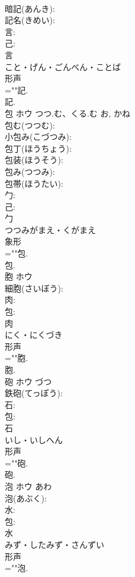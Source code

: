 \documentclass[8pt]{extreport}
\begin{document}
\begin{CJK}{UTF8}{min}
\\	暗記(あんき): 
\\	記名(きめい): 
\\	言: 
\\	己: 
\\	言	
\\	こと・げん・ごんべん・ことば	
\\	形声 
\\	=""記.
\\	記.
\\	包	ホウ	つつ.む、くる.む	お, かね	
\\	包む(つつむ): 
\\	小包み(こづつみ): 
\\	包丁(ほうちょう): 
\\	包装(ほうそう): 
\\	包み(つつみ): 
\\	包帯(ほうたい): 
\\	勹: 
\\	己: 
\\	勹	
\\	つつみがまえ・くがまえ	
\\	象形 
\\	=""包.
\\	包.
\\	胞	ホウ			
\\	細胞(さいぼう): 
\\	肉: 
\\	包: 
\\	肉	
\\	にく・にくづき	
\\	形声 
\\	=""胞.
\\	胞.
\\	砲	ホウ		づつ	
\\	鉄砲(てっぽう): 
\\	石: 
\\	包: 
\\	石	
\\	いし・いしへん	
\\	形声 
\\	=""砲.
\\	砲.
\\	泡	ホウ	あわ		
\\	泡(あぶく): 
\\	水: 
\\	包: 
\\	水	
\\	みず・したみず・さんずい	
\\	形声 
\\	=""泡.

\end{CJK}
\end{document}

